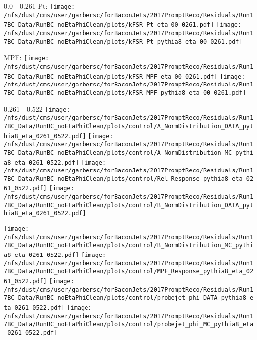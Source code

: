 \documentclass[t,compress]{beamer}
\begin{document}
\begin{frame}{0.0 - 0.261}
	 Pt: \texttt{[image: /nfs/dust/cms/user/garbersc/forBaconJets/2017PromptReco/Residuals/Run17BC\_Data/RunBC\_noEtaPhiClean/plots/kFSR\_Pt\_eta\_00\_0261.pdf]}
	\texttt{[image: /nfs/dust/cms/user/garbersc/forBaconJets/2017PromptReco/Residuals/Run17BC\_Data/RunBC\_noEtaPhiClean/plots/kFSR\_Pt\_pythia8\_eta\_00\_0261.pdf]}
\newline

	 MPF: \texttt{[image: /nfs/dust/cms/user/garbersc/forBaconJets/2017PromptReco/Residuals/Run17BC\_Data/RunBC\_noEtaPhiClean/plots/kFSR\_MPF\_eta\_00\_0261.pdf]}
	\texttt{[image: /nfs/dust/cms/user/garbersc/forBaconJets/2017PromptReco/Residuals/Run17BC\_Data/RunBC\_noEtaPhiClean/plots/kFSR\_MPF\_pythia8\_eta\_00\_0261.pdf]}
\end{frame}

\begin{frame}{0.261 - 0.522}
	\texttt{[image: /nfs/dust/cms/user/garbersc/forBaconJets/2017PromptReco/Residuals/Run17BC\_Data/RunBC\_noEtaPhiClean/plots/control/A\_NormDistribution\_DATA\_pythia8\_eta\_0261\_0522.pdf]}
	\texttt{[image: /nfs/dust/cms/user/garbersc/forBaconJets/2017PromptReco/Residuals/Run17BC\_Data/RunBC\_noEtaPhiClean/plots/control/A\_NormDistribution\_MC\_pythia8\_eta\_0261\_0522.pdf]}
	\texttt{[image: /nfs/dust/cms/user/garbersc/forBaconJets/2017PromptReco/Residuals/Run17BC\_Data/RunBC\_noEtaPhiClean/plots/control/Rel\_Response\_pythia8\_eta\_0261\_0522.pdf]}
	\texttt{[image: /nfs/dust/cms/user/garbersc/forBaconJets/2017PromptReco/Residuals/Run17BC\_Data/RunBC\_noEtaPhiClean/plots/control/B\_NormDistribution\_DATA\_pythia8\_eta\_0261\_0522.pdf]}
\newline

	\texttt{[image: /nfs/dust/cms/user/garbersc/forBaconJets/2017PromptReco/Residuals/Run17BC\_Data/RunBC\_noEtaPhiClean/plots/control/B\_NormDistribution\_MC\_pythia8\_eta\_0261\_0522.pdf]}
	\texttt{[image: /nfs/dust/cms/user/garbersc/forBaconJets/2017PromptReco/Residuals/Run17BC\_Data/RunBC\_noEtaPhiClean/plots/control/MPF\_Response\_pythia8\_eta\_0261\_0522.pdf]}
	\texttt{[image: /nfs/dust/cms/user/garbersc/forBaconJets/2017PromptReco/Residuals/Run17BC\_Data/RunBC\_noEtaPhiClean/plots/control/probejet\_phi\_DATA\_pythia8\_eta\_0261\_0522.pdf]}
	\texttt{[image: /nfs/dust/cms/user/garbersc/forBaconJets/2017PromptReco/Residuals/Run17BC\_Data/RunBC\_noEtaPhiClean/plots/control/probejet\_phi\_MC\_pythia8\_eta\_0261\_0522.pdf]}
\end{frame}
\end{document}
